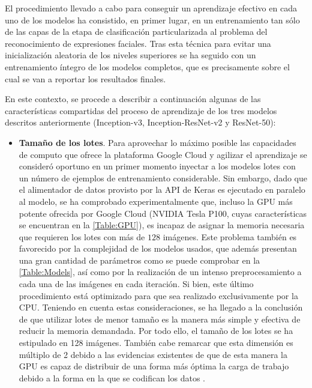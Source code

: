 El procedimiento llevado a cabo para conseguir un aprendizaje efectivo en cada uno de los modelos ha consistido, en primer lugar, en un entrenamiento tan sólo de las capas de la etapa de clasificación particularizada al problema del reconocimiento de expresiones faciales. Tras esta técnica para evitar una inicialización aleatoria de los niveles superiores se ha seguido con un entrenamiento íntegro de los modelos completos, que es precisamente sobre el cual se van a reportar los resultados finales.

En este contexto, se procede a describir a continuación algunas de las características compartidas del proceso de aprendizaje de los tres modelos descritos anteriormente (Inception-v3, Inception-ResNet-v2 y ResNet-50):
\begin{itemize}
    \item \textbf{Tamaño de los lotes}. Para aprovechar lo máximo posible las capacidades de computo que ofrece la plataforma Google Cloud y agilizar el aprendizaje se consideró oportuno en un primer momento inyectar a los modelos lotes con un número de ejemplos de entrenamiento considerable. Sin embargo, dado que el alimentador de datos provisto por la API de Keras es ejecutado en paralelo al modelo, se ha comprobado experimentalmente que, incluso la GPU más potente ofrecida por Google Cloud (NVIDIA Tesla P100, cuyas características se encuentran en la \autoref{Table:GPU}), es incapaz de asignar la memoria necesaria que requieren los lotes con más de $128$ imágenes. Este problema también es favorecido por la complejidad de los modelos usados, que además presentan una gran cantidad de parámetros como se puede comprobar en la \autoref{Table:Models}, así como por la realización de un intenso preprocesamiento a cada una de las imágenes en cada iteración. Si bien, este último procedimiento está optimizado para que sea realizado exclusivamente por la CPU. Teniendo en cuenta estas consideraciones, se ha llegado a la conclusión de que utilizar lotes de menor tamaño es la manera más simple y efectiva de reducir la memoria demandada. Por todo ello, el tamaño de los lotes se ha estipulado en 128 imágenes. También cabe remarcar que esta dimensión es múltiplo de 2 debido a las evidencias existentes de que de esta manera la GPU es capaz de distribuir de una forma más óptima la carga de trabajo debido a la forma en la que se codifican los datos \cite{BatchSize}.

\end{itemize}

